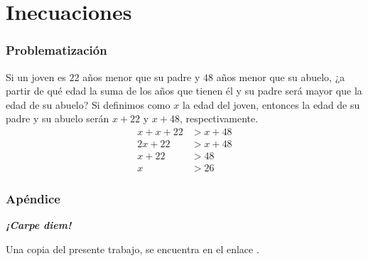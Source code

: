 \documentclass[12pt,spanish,x11names]{beamer}
\title{\talktitle}
\subtitle{\talksubtitle}
\author{\talkauthor}
\institute{\talkaffiliation}
\date{\footnotesize{\emph{\href{\talkblog}{\talkemail}}}}
\def\talktitle{Inecuaciones lineales}
\def\talkpubpdf{https://github.com/hsigrist/LMLA/blob/master/4TP/talks/inecuaciones-lineales.pdf}
\newcommand{\framedhref}[2]{\href{#1}{\fcolorbox{bluu}{bluu}{\textcolor{white}{#2}}}}
\begin{document}
\begin{frame}
\titlepage
\end{frame}
\section{Inecuaciones}
\begin{frame}
  \frametitle{Problematización}
  \begin{exampleblock}{Si un joven es $22$ años menor que su padre y $48$ años menor que su abuelo,
¿a partir de qué edad la suma de los años que tienen él y su padre será mayor
que la edad de su abuelo?}
\pause
    Si definimos como $x$ la edad del joven, entonces la edad de su padre y su abuelo
    serán $x+22$ y $x+48$, respectivamente.
    \begin{align*}
      x+x+22&>x+48\\
      2x+22&>x+48\\
      x+22&>48\\
      x&>26
    \end{align*}
  \end{exampleblock}
\end{frame}






\begin{frame}[c]\frametitle{Apéndice}
\centering\decofourleft\quad\decofourright

\textbf{\emph {¡Carpe diem!}}

Una copia del presente trabajo, se encuentra en el enlace \framedhref{\talkpubpdf}{\talktitle}.
\end{frame}
\end{document}
